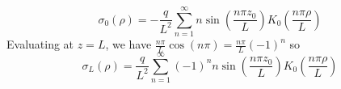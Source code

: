 \documentclass[a4paper,twoside]{article}
\begin{document}
\begin{itemize}
\begin{tcolorbox}[breakable]
            \begin{equation}
                \sigma_0(\rho) = - \frac{q}{L^2} \sum_{n=1}^{\infty} n \sin \left( \frac{n \pi z_0}{L} \right) K_0 \left( \frac{n \pi \rho}{L} \right)
            \end{equation}
            Evaluating at $ z = L $, we have $ \frac{n \pi}{L} \cos(n \pi) = \frac{n \pi}{L} (-1)^n $ so
            \begin{equation}
                \sigma_L(\rho) = \frac{q}{L^2} \sum_{n=1}^{\infty} (-1)^n n \sin \left( \frac{n \pi z_0}{L} \right) K_0 \left( \frac{n \pi \rho}{L} \right)
            \end{equation}
        \end{tcolorbox}
\end{itemize}
\end{document}
